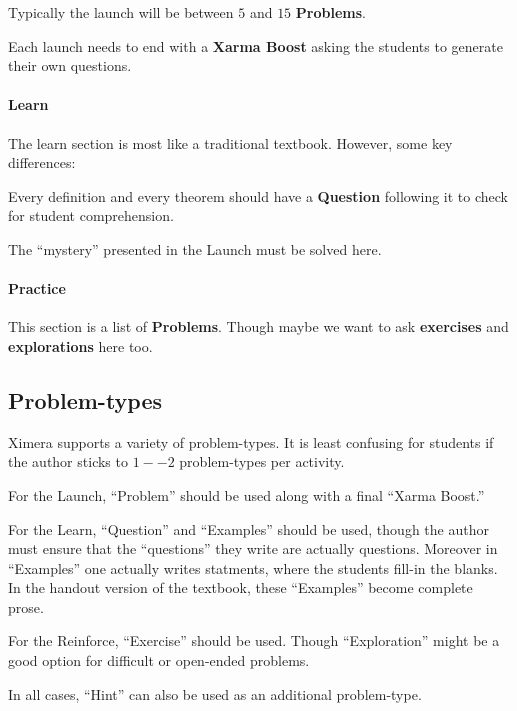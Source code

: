 \documentclass{article}
\begin{document}
Typically the launch will be between $5$ and $15$ \textbf{Problems}.

Each launch needs to end with a \textbf{Xarma Boost} asking the
students to generate their own questions.


\paragraph{Learn}


The learn section is most like a traditional textbook. However, some key differences:


Every definition and every theorem should have a \textbf{Question}
following it to check for student comprehension.


The ``mystery'' presented in the Launch must be solved here. 



\paragraph{Practice}

This section is a list of \textbf{Problems}. Though maybe we want to
ask \textbf{exercises} and \textbf{explorations} here too.



\subsection*{Problem-types}

Ximera supports a variety of problem-types. It is least confusing for
students if the author sticks to $1--2$ problem-types per activity.



For the Launch, ``Problem'' should be used along with a final ``Xarma
Boost.''



For the Learn, ``Question'' and ``Examples'' should be used, though
the author must ensure that the ``questions'' they write are actually
questions. Moreover in ``Examples'' one actually writes statments,
where the students fill-in the blanks. In the handout version of the
textbook, these ``Examples'' become complete prose. 



For the Reinforce, ``Exercise'' should be used. Though ``Exploration''
might be a good option for difficult or open-ended problems.



In all cases, ``Hint'' can also be used as an additional problem-type.
\end{document}
